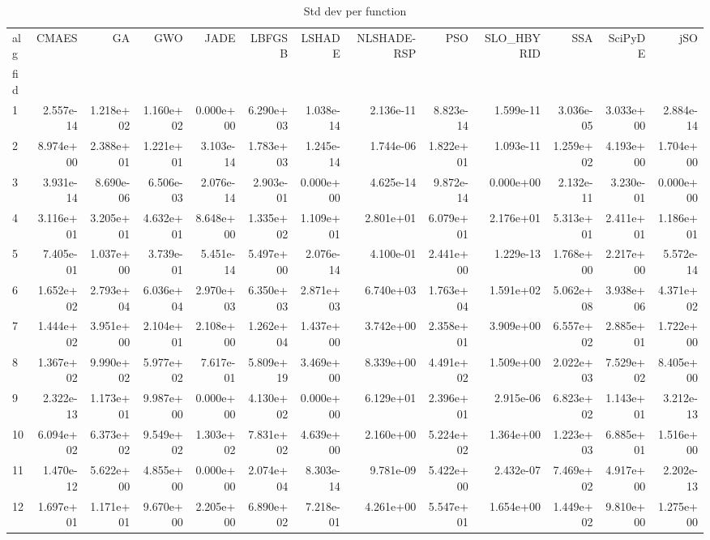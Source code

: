 \begin{table}
\caption{Std dev per function}
\label{tab:std_all}
\begin{tabular}{lrrrrrrrrrrrr}
\toprule
alg & CMAES & GA & GWO & JADE & LBFGSB & LSHADE & NLSHADE-RSP & PSO & SLO_HBYRID & SSA & SciPyDE & jSO \\
fid &  &  &  &  &  &  &  &  &  &  &  &  \\
\midrule
1 & 2.557e-14 & 1.218e+02 & 1.160e+02 & 0.000e+00 & 6.290e+03 & 1.038e-14 & 2.136e-11 & 8.823e-14 & 1.599e-11 & 3.036e-05 & 3.033e+00 & 2.884e-14 \\
2 & 8.974e+00 & 2.388e+01 & 1.221e+01 & 3.103e-14 & 1.783e+03 & 1.245e-14 & 1.744e-06 & 1.822e+01 & 1.093e-11 & 1.259e+02 & 4.193e+00 & 1.704e+00 \\
3 & 3.931e-14 & 8.690e-06 & 6.506e-03 & 2.076e-14 & 2.903e-01 & 0.000e+00 & 4.625e-14 & 9.872e-14 & 0.000e+00 & 2.132e-11 & 3.230e-01 & 0.000e+00 \\
4 & 3.116e+01 & 3.205e+01 & 4.632e+01 & 8.648e+00 & 1.335e+02 & 1.109e+01 & 2.801e+01 & 6.079e+01 & 2.176e+01 & 5.313e+01 & 2.411e+01 & 1.186e+01 \\
5 & 7.405e-01 & 1.037e+00 & 3.739e-01 & 5.451e-14 & 5.497e+00 & 2.076e-14 & 4.100e-01 & 2.441e+00 & 1.229e-13 & 1.768e+00 & 2.217e+00 & 5.572e-14 \\
6 & 1.652e+02 & 2.793e+04 & 6.036e+04 & 2.970e+03 & 6.350e+03 & 2.871e+03 & 6.740e+03 & 1.763e+04 & 1.591e+02 & 5.062e+08 & 3.938e+06 & 4.371e+02 \\
7 & 1.444e+02 & 3.951e+00 & 2.104e+01 & 2.108e+00 & 1.262e+04 & 1.437e+00 & 3.742e+00 & 2.358e+01 & 3.909e+00 & 6.557e+02 & 2.885e+01 & 1.722e+00 \\
8 & 1.367e+02 & 9.990e+02 & 5.977e+02 & 7.617e-01 & 5.809e+19 & 3.469e+00 & 8.339e+00 & 4.491e+02 & 1.509e+00 & 2.022e+03 & 7.529e+02 & 8.405e+00 \\
9 & 2.322e-13 & 1.173e+01 & 9.987e+00 & 0.000e+00 & 4.130e+02 & 0.000e+00 & 6.129e+01 & 2.396e+01 & 2.915e-06 & 6.823e+02 & 1.143e+01 & 3.212e-13 \\
10 & 6.094e+02 & 6.373e+02 & 9.549e+02 & 1.303e+02 & 7.831e+02 & 4.639e+00 & 2.160e+00 & 5.224e+02 & 1.364e+00 & 1.223e+03 & 6.885e+01 & 1.516e+00 \\
11 & 1.470e-12 & 5.622e+00 & 4.855e+00 & 0.000e+00 & 2.074e+04 & 8.303e-14 & 9.781e-09 & 5.422e+00 & 2.432e-07 & 7.469e+02 & 4.917e+00 & 2.202e-13 \\
12 & 1.697e+01 & 1.171e+01 & 9.670e+00 & 2.205e+00 & 6.890e+02 & 7.218e-01 & 4.261e+00 & 5.547e+01 & 1.654e+00 & 1.449e+02 & 9.810e+00 & 1.275e+00 \\
\bottomrule
\end{tabular}
\end{table}
